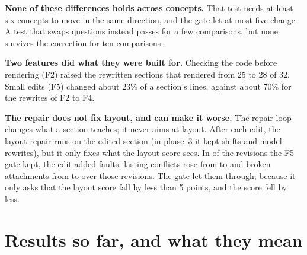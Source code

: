 \documentclass[11pt]{article}
\begin{document}
\textbf{None of these differences holds across concepts.} That test needs at least six concepts to move in the same
direction, and the gate let at most five change. A test that swaps questions instead passes for a few comparisons, but
none survives the correction for ten comparisons.

\textbf{Two features did what they were built for.} Checking the code before rendering (F2) raised the rewritten
sections that rendered from 25 to 28 of 32. Small edits (F5) changed about 23\% of a section's lines, against about
70\% for the rewrites of F2 to F4.

\textbf{The repair does not fix layout, and can make it worse.} The repair loop changes what a section teaches; it
never aims at layout. After each edit, the layout repair runs on the edited section (in phase~3 it kept
\RLShiftFixes{} shifts and \RLModelFixes{} model rewrites), but it only fixes what the layout score sees. In
\RLWorse{} of the \RLRevisions{} revisions the F5 gate kept, the edit added faults: lasting conflicts rose from
\RLConflictsBase{} to \RLConflictsLearner{} and broken attachments from \RLAttachBase{} to \RLAttachLearner{} over
those revisions. The gate let them through, because it only asks that the layout score fall by less than 5 points,
and the score fell by less.




\section{Results so far, and what they mean}\label{sec:results-long}
\end{document}
